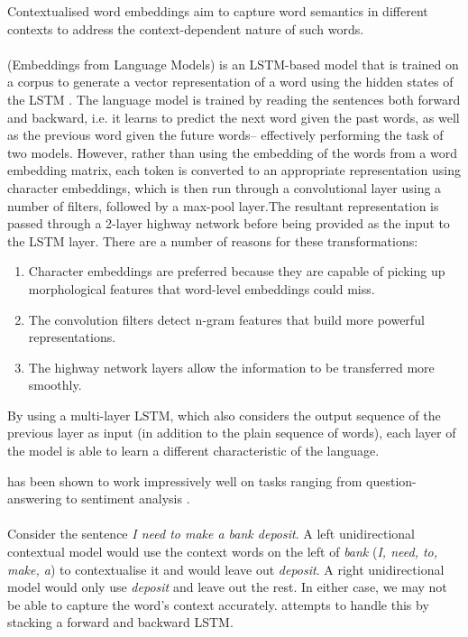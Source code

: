 \noindent
Contextualised word embeddings aim to capture word semantics in different contexts to address the context-dependent nature of such words.

\paragraph{\elmo}
\elmo (Embeddings from Language Models) is an LSTM-based model that is trained on a corpus to generate a vector representation of a word using the hidden states of the LSTM \citep{Peters2018}. The language model is trained by reading the sentences both forward and backward, i.e. it learns to predict the next word given the past words, as well as the previous word given the future words-- effectively performing the task of two models. However, rather than using the embedding of the words from a word embedding matrix, each token is converted to an appropriate representation using character embeddings, which is then run through a convolutional layer using a number of filters, followed by a max-pool layer.The resultant representation is passed through a 2-layer highway network before being provided as the input to the LSTM layer.
There are a number of reasons for these transformations:
\begin{enumerate}
    \item Character embeddings are preferred because they are capable of picking up morphological features that word-level embeddings could miss.
    \item The convolution filters detect n-gram features that build more powerful representations.
    \item The highway network layers allow the information to be transferred more smoothly. 
\end{enumerate}

By using a multi-layer LSTM, which also considers the output sequence of the previous layer as input (in addition to the plain sequence of words), each layer of the model is able to learn a different characteristic of the language.

\elmo has been shown to work impressively well on tasks ranging from question-answering to sentiment analysis \citep{Peters2018}.

\paragraph{\bert}
Consider the sentence \textit{I need to make a bank deposit}. A left unidirectional contextual model would use the context words on the left of \textit{bank} (\textit{I, need, to, make, a}) to contextualise it and would leave out \textit{deposit}. A right unidirectional model would only use \textit{deposit} and leave out the rest. In either case, we may not be able to capture the word's context accurately. \elmo attempts to handle this by stacking a forward and backward LSTM.

